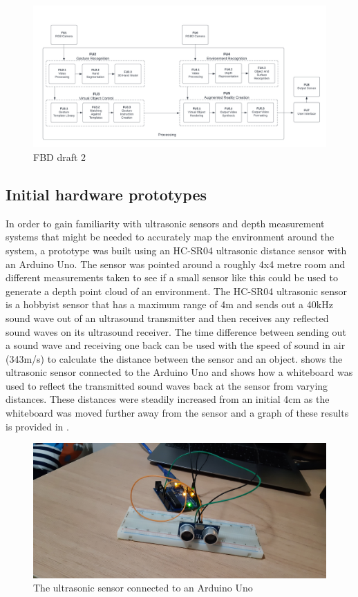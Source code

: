 \begin{figure}[h]
    \centering
    \includegraphics[width=1\linewidth]{figures/Functional Block Diagram_draft2.png}
    \caption{FBD draft 2}
    \label{fig:fbd_draft2}
\end{figure}

\subsection{Initial hardware prototypes}

In order to gain familiarity with ultrasonic sensors and depth measurement systems that might be needed to accurately map the environment around the system, a prototype was built using an HC-SR04 ultrasonic distance sensor with an Arduino Uno. The sensor was pointed around a roughly 4x4 metre room and different measurements taken to see if a small sensor like this could be used to generate a depth point cloud of an environment. The HC-SR04 ultrasonic sensor is a hobbyist sensor that has a maximum range of 4m and sends out a 40kHz sound wave out of an ultrasound transmitter and then receives any reflected sound waves on its ultrasound receiver. The time difference between sending out a sound wave and receiving one back can be used with the speed of sound in air (343m/s) to calculate the distance between the sensor and an object.  shows the ultrasonic sensor connected to the Arduino Uno and  shows how a whiteboard was used to reflect the transmitted sound waves back at the sensor from varying distances. These distances were steadily increased from an initial 4cm as the whiteboard was moved further away from the sensor and a graph of these results is provided in . \newline

\begin{figure}[h]
    \centering
    \includegraphics[width=0.5\linewidth]{figures/ultrasonic_prototype_setup2.jpg}
    \caption{The ultrasonic sensor connected to an Arduino Uno}
    \label{fig:ultrasonic_setup}
\end{figure}

